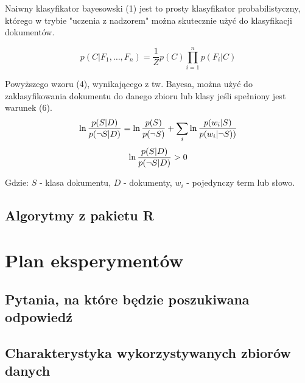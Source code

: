 \documentclass[a4paper, 10pt]{article}
\begin{document}
Naiwny klasyfikator bayesowski (1) jest to prosty klasyfikator probabilistyczny, którego w trybie "uczenia z nadzorem" można skutecznie użyć do 
klasyfikacji dokumentów.

\begin{equation}
p(C \vert F_1,\dots,F_n) = \frac{1}{Z}  p(C) \prod_{i=1}^n p(F_i \vert C)
\end{equation}

Powyższego wzoru (4), wynikającego z tw. Bayesa, można użyć do zaklasyfikowania dokumentu do danego zbioru lub klasy jeśli spełniony jest warunek (6).
\begin{equation}
\ln{p(S\vert D)\over p(\neg S\vert D)}=\ln{p(S)\over p(\neg S)}+\sum_i \ln{p(w_i\vert S)\over p(w_i\vert\neg S))}
\end{equation}
\begin{equation}
\ln{p(S\vert D)\over p(\neg S\vert D)} > 0
\end{equation}

Gdzie: $S$ - klasa dokumentu, $D$ - dokumenty, $w_i$ - pojedynczy term lub słowo.




\subsection{Algorytmy z pakietu R}


\section{Plan eksperymentów}
\subsection{Pytania, na które będzie poszukiwana odpowiedź}
\subsection{Charakterystyka wykorzystywanych zbiorów danych}
	
\end{document}
